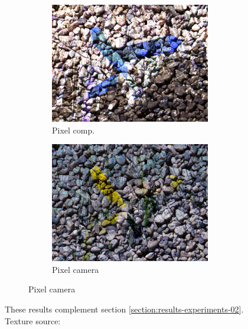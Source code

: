 \begin{figure}[]
\begin{subfigure}{\textwidth}
\begin{subfigure}{0.24\textwidth}
            \includegraphics[width=\textwidth]{images/04-experiment02/photo/pebbles/pixel_im.jpg}
            \caption*{Pixel comp.}
        \end{subfigure}
        \hfill
        \begin{subfigure}{0.24\textwidth}
            \centering
            \includegraphics[width=\textwidth]{images/04-experiment02/photo/pebbles/pixel_proj.jpg}
            \caption*{Pixel camera}
        \end{subfigure}
    \end{subfigure}
    \caption{These results complement section \ref{section:results-experiments-02}. Texture source: \citet{Pixar128}}
    \label{fig:ex02-complete-photo-marble_wood_pebbles}
\end{figure}

